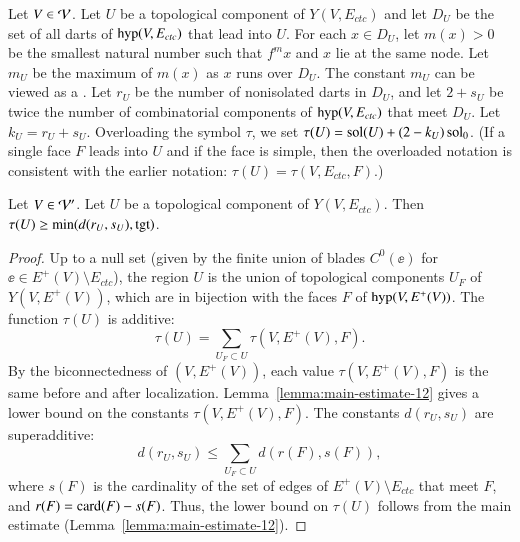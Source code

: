 \documentclass{llncs}
\def\op#1{{\hbox{#1}}}
\begin{document}
\begin{definition}[$D_U$,~$m_U$,~$r_U$,~$s_U$,~$k_U$,~$\tau(U)$]
  Let $V\in {\mathcal V}$.  Let $U$ be a topological component of
  $Y(V,E_{ctc})$ and let $D_U$ be the set of all darts of $\op{hyp}(V,E_{ctc})$
 that lead into
  $U$.   For each
  $x\in D_U$, let $m(x) >0$ be the smallest natural number such that
  $f^{m} x$ and $x$ lie at the same node.  Let $m_U$ be the maximum of
  $m(x)$  as $x$ runs over $D_U$.  The constant $m_U$ can be viewed as
  a .  
Let $r_U$ be the number of nonisolated darts in $D_U$, and let $2+s_U$ be twice the
  number of combinatorial components of $\op{hyp}(V,E_{ctc})$ that
  meet $D_U$.  Let $k_U=r_U+s_U$.  Overloading the symbol $\tau$, we
  set $\tau(U) = \operatorname{sol}(U) +  (2-k_U)\operatorname{sol}_0$.   (If a single  face $F$ leads into
  $U$ and if the face is simple, then the overloaded notation is consistent
with the earlier notation: $\tau(U) = \tau(V,E_{ctc},F)$.)
%
\end{definition}

\begin{lemma}\label{lemma:tauU'}
  Let $V\in {\mathcal V}'$.
Let $U$ be a topological component of
  $Y(V,E_{ctc})$.   Then $\tau(U)\ge \min(d(r_U,s_U),\op{tgt})$.
\end{lemma}

\begin{proof}
Up to a null set (given by the finite union of blades $C^0(\ee)$ for
$\ee\in E^+(V)\setminus E_{ctc}$), the region $U$ is the union of topological
components $U_F$ of $Y(V,E^+(V))$, which are in bijection with the faces
$F$ of $\op{hyp}(V,E^+(V))$.  The function $\tau(U)$ is additive:
\begin{equation}\label{eqn:tau-additive}
\tau(U) = \sum_{U_F\subset U} \tau(V,E^+(V),F).
\end{equation}
By the biconnectedness of $(V,E^+(V))$, each value $\tau(V,E^+(V),F)$ is the
same before and after localization.
Lemma~\ref{lemma:main-estimate-12} gives a lower bound on the
constants $\tau(V,E^+(V),F)$.  The constants $d(r_U,s_U)$ are superadditive:
\[
d(r_U,s_U) \le \sum_{U_F\subset U} d(r(F),s(F)),
\]
where $s(F)$ is the cardinality of the set of edges of $E^+(V)\setminus
E_{ctc}$ that meet $F$, and $r(F) = \card(F)-s(F)$.  Thus, the 
lower bound on $\tau(U)$ follows from the main estimate
(Lemma~\ref{lemma:main-estimate-12}).
\end{proof}
\end{document}
